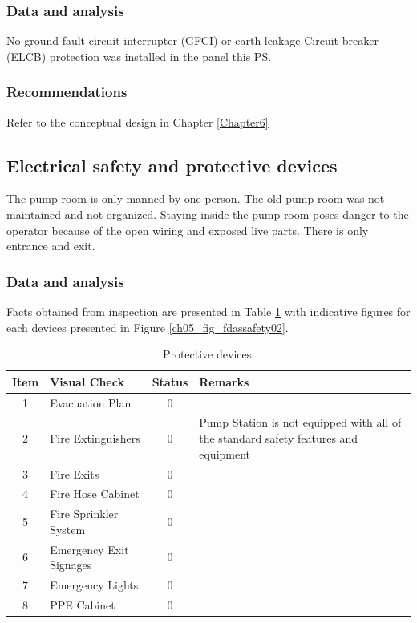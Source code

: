 \subsubsection{Data and analysis}
No ground fault circuit interrupter (GFCI) or earth leakage Circuit breaker (ELCB) protection was installed in the panel this PS.
\subsubsection{Recommendations}
Refer to the conceptual design in Chapter \ref{Chapter6}
\subsection{Electrical safety and protective devices} \label{ch04fdas04}
The pump room is only manned by one person. The old pump room was not maintained and not organized.  Staying inside the pump room poses danger to the operator because of the open wiring and exposed live parts. There is only entrance and exit.  




\subsubsection{Data and analysis}
Facts obtained from inspection are presented in Table \ref{ch05_tbl_fdassafe01} with indicative figures for each devices presented in Figure \ref{ch05_fig_fdassafety02}.

\begin{table}[!htb]
	\caption{Protective devices.}
	\label{ch05_tbl_fdassafe01}
	{\scriptsize
\begin{tabular}{c|l|c|p{6cm}}
	\hline
	Item & Visual Check  & Status & Remarks \\ 
	\hline
	1 & Evacuation Plan & 0 &  \\ 
	2 & Fire Extinguishers & 0 & Pump Station is not equipped with all of the standard safety features and equipment \\ 
	3 & Fire Exits & 0 &  \\ 
	4 & Fire Hose Cabinet & 0 &  \\ 
	5 & Fire Sprinkler System & 0 &  \\ 
	6 & Emergency Exit Signages & 0 &  \\ 
	7 & Emergency Lights & 0 &  \\ 
	8 & PPE Cabinet & 0 &  \\ 
	\hline
\end{tabular}

}
\end{table}



